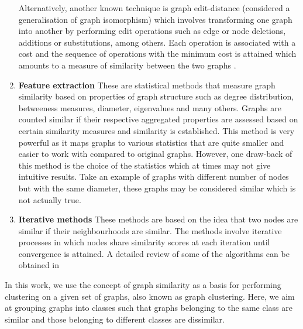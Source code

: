 \documentclass[10pt,a4paper]{article}
\theoremstyle{plain}
\theoremstyle{definition}
\begin{document}
\begin{enumerate}
     Alternatively, another known technique is graph edit-distance (considered a generalisation of graph isomorphism) which involves transforming one graph into another by performing edit operations such as edge or node deletions, additions or substitutions, among others. Each operation is associated with a cost and the sequence of operations with the minimum cost is attained which amounts to a measure of similarity between the two graphs \citep{gao2010survey}.
     
     \item \textbf{Feature extraction}
     These are statistical methods that measure graph similarity based on properties of graph structure such as degree distribution, betweeness measures, diameter, eigenvalues and many others. Graphs are counted similar if their respective aggregated properties are assessed based on certain similarity measures and similarity is established. This method is very powerful as it maps graphs to various statistics that are quite smaller and easier to work with compared to original graphs. However, one draw-back of this method is the choice of the statistics which at times may not give intuitive results. Take an example of graphs with different number of nodes but with the same diameter, these graphs may be considered similar which is not actually true.
     
     \item \textbf{Iterative methods}
     These methods are based on the idea that two nodes are similar if their neighbourhoods are similar. The methods involve iterative processes in which nodes share similarity scores at each iteration until convergence is attained. A detailed review of some of the algorithms can be obtained in  \citep{jeh2002simrank,melnik2002similarity,zager2008graph}
     \end{enumerate}
     In this work, we use the concept of graph similarity as a basis for performing clustering on a given set of graphs, also known as graph clustering. Here, we aim at grouping graphs into classes such that graphs belonging to the same class are similar and those belonging to different classes are dissimilar. 
 
\end{document}
